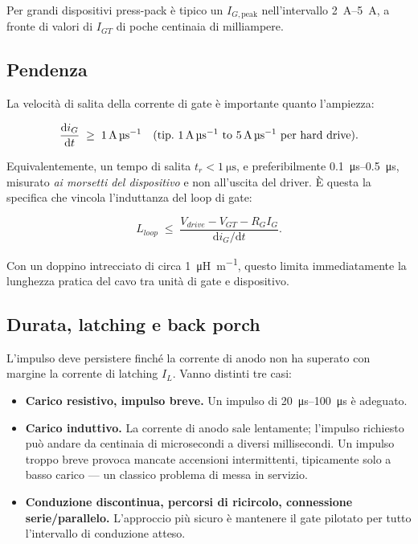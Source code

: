 \documentclass[11pt,a4paper]{article}
\begin{document}
Per grandi dispositivi press-pack è tipico un $I_{G,\text{peak}}$ nell'intervallo
\SIrange{2}{5}{\ampere}, a fronte di valori di $I_{GT}$ di poche centinaia di
milliampere.

\subsection{Pendenza}

La velocità di salita della corrente di gate è importante quanto l'ampiezza:

\begin{equation}
  \frac{\mathrm{d}i_G}{\mathrm{d}t} \;\ge\; \SI{1}{\ampere\per\micro\second}
  \quad \text{(tip.\ \SIrange{1}{5}{\ampere\per\micro\second} per hard drive).}
  \label{eq:didt}
\end{equation}

Equivalentemente, un tempo di salita $t_r < \SI{1}{\micro\second}$, e preferibilmente
\SIrange{0.1}{0.5}{\micro\second}, misurato \emph{ai morsetti del dispositivo} e non
all'uscita del driver. È questa la specifica che vincola l'induttanza del loop di
gate:

\begin{equation}
  L_{loop} \;\le\; \frac{V_{drive} - V_{GT} - R_G I_G}{\mathrm{d}i_G/\mathrm{d}t}.
  \label{eq:lloop}
\end{equation}

Con un doppino intrecciato di circa \SI{1}{\micro\henry\per\metre}, questo limita
immediatamente la lunghezza pratica del cavo tra unità di gate e dispositivo.

\subsection{Durata, latching e back porch}

L'impulso deve persistere finché la corrente di anodo non ha superato con margine la
corrente di latching $I_L$. Vanno distinti tre casi:

\begin{itemize}
  \item \textbf{Carico resistivo, impulso breve.} Un impulso di
        \SIrange{20}{100}{\micro\second} è adeguato.
  \item \textbf{Carico induttivo.} La corrente di anodo sale lentamente; l'impulso
        richiesto può andare da centinaia di microsecondi a diversi millisecondi. Un
        impulso troppo breve provoca mancate accensioni intermittenti, tipicamente
        solo a basso carico --- un classico problema di messa in servizio.
  \item \textbf{Conduzione discontinua, percorsi di ricircolo, connessione
        serie/parallelo.} L'approccio più sicuro è mantenere il gate pilotato per
        tutto l'intervallo di conduzione atteso.
\end{itemize}
\end{document}
